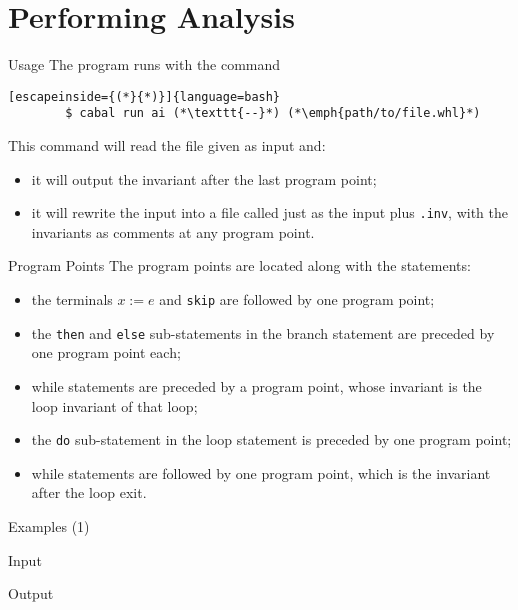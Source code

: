 \section{Performing Analysis}

\begin{frame}[fragile]{Usage}
    The program runs with the command
    \begin{lstlisting}[escapeinside={(*}{*)}]{language=bash}
        $ cabal run ai (*\texttt{--}*) (*\emph{path/to/file.whl}*)
    \end{lstlisting}
    This command will read the file given as input and:
    \begin{itemize}
        \item it will output the invariant after the last program point;
        \item it will rewrite the input into a file called just as the input plus \texttt{.inv}, with the invariants as comments at any program point.
    \end{itemize}
    
\end{frame}

\begin{frame}{Program Points}
    The program points are located along with the statements:
    \begin{itemize}
        \item the terminals $x\mathtt{ := }e$ and \texttt{skip} are followed by one program point;
        \item the \texttt{then} and \texttt{else} sub-statements in the branch statement are preceded by one program point each;
        \item while statements are preceded by a program point, whose invariant is the loop invariant of that loop;
        \item the \texttt{do} sub-statement in the loop statement is preceded by one program point;
        \item while statements are followed by one program point, which is the invariant after the loop exit.
    \end{itemize}
\end{frame}

\begin{frame}[fragile]{Examples (1)}
    \begin{block}{Input}
        \small
    \end{block}
    \begin{block}{Output}
        \small
    \end{block}
\end{frame}

